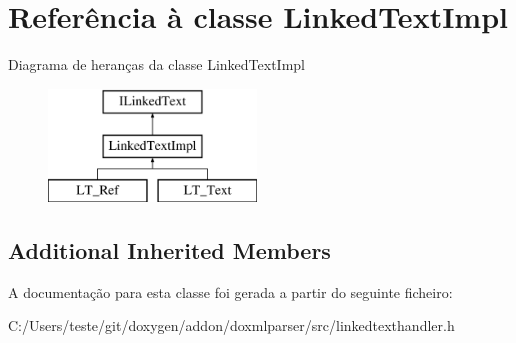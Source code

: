 \hypertarget{class_linked_text_impl}{\section{Referência à classe Linked\-Text\-Impl}
\label{class_linked_text_impl}
}
Diagrama de heranças da classe Linked\-Text\-Impl\begin{figure}[H]
\begin{center}
\leavevmode
\includegraphics[height=3.000000cm]{class_linked_text_impl}
\end{center}
\end{figure}
\subsection*{Additional Inherited Members}


A documentação para esta classe foi gerada a partir do seguinte ficheiro\-:\begin{DoxyCompactItemize}
\item 
C\-:/\-Users/teste/git/doxygen/addon/doxmlparser/src/linkedtexthandler.\-h\end{DoxyCompactItemize}
